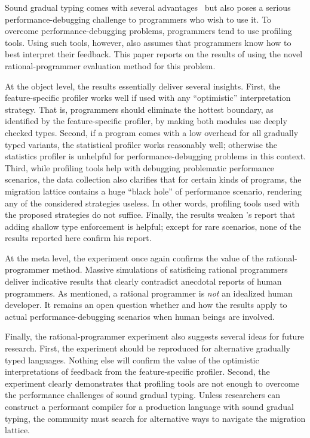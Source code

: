 

Sound gradual typing comes with several advantages~\cite{lgfd-icfp-2021,
lgfd-icfp-2023} but also poses a serious performance-debugging challenge to
programmers who wish to use it. To overcome performance-debugging problems,
programmers tend to use profiling tools. Using such tools, however, also assumes
that programmers know how to best interpret their feedback. This paper reports
on the results of using the novel rational-programmer evaluation method for this
problem.

At the object level, the results essentially deliver several insights. First,
the feature-specific profiler works well if used with any ``optimistic''
interpretation strategy. That is, programmers should eliminate the hottest
boundary, as identified by the feature-specific profiler, by making both modules
use deeply checked types. Second, if a program comes with a low overhead for all
gradually typed variants, the statistical profiler works reasonably well;
otherwise the statistics profiler is unhelpful for performance-debugging
problems in this context. Third, while profiling tools help with debugging
problematic performance scenarios, the data collection also clarifies that for
certain kinds of programs, the migration lattice contains a huge ``black hole''
of performance scenario, rendering any of the considered strategies
useless. In other words, profiling tools used with the proposed strategies do
not suffice. Finally, the results weaken \citet{g-deep-shallow}'s report that
adding shallow type enforcement is helpful; except for rare scenarios, none of
the results reported here confirm his report.

At the meta level, the experiment once again confirms the value of the
rational-programmer method. Massive simulations of satisficing rational
programmers deliver indicative results that clearly contradict anecdotal reports
of human programmers. As mentioned, a rational programmer is {\em not\/} an
idealized human developer. It remains an open question whether and how the
results apply to actual performance-debugging scenarios when human beings are
involved.

Finally, the rational-programmer experiment also suggests several ideas for
future research. First, the experiment should be reproduced for alternative
gradually typed languages. Nothing else will confirm the value of the optimistic
interpretations of feedback from the feature-specific profiler. Second, the
experiment clearly demonstrates that profiling tools are not enough to overcome
the performance challenges of sound gradual typing. Unless researchers can
construct a performant compiler for a production language with sound gradual
typing, the community must search for alternative ways to navigate the migration
lattice. 



